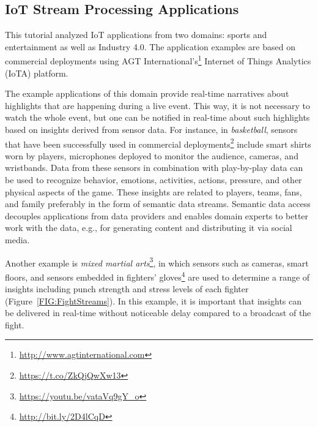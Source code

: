 \subsection{IoT Stream Processing Applications}
This tutorial analyzed IoT applications from two domains: sports and entertainment as well as Industry 4.0. The application examples are based on commercial deployments using AGT International's\footnote{\url{http://www.agtinternational.com}} Internet of Things Analytics (IoTA) platform.

The example applications of this domain provide real-time narratives about highlights that are happening during a live event. This way, it is not necessary to watch the whole event, but one can be notified in real-time about such highlights based on insights derived from sensor data. For instance, in \emph{basketball}, sensors that have been successfully used in commercial deployments\footnote{\url{https://t.co/ZkQjQwXw13}} include smart shirts worn by players, microphones deployed to monitor the audience,  cameras, and wristbands. Data from these sensors in combination with play-by-play data can be used to recognize behavior, emotions, activities, actions, pressure, and other physical aspects of the game. These insights are related to players, teams, fans, and family preferably in the form of semantic data streams. Semantic data access decouples applications from data providers and enables domain experts to better work with the data, e.g., for generating content and distributing it via social media.

Another example is \emph{mixed martial arts}\footnote{\url{https://youtu.be/vataVq9gY_o}}, in which sensors such as cameras, smart floors, and sensors embedded in fighters' gloves\footnote{\url{http://bit.ly/2D4lCqD}} are used to determine a range of insights including punch strength and stress levels of each fighter (Figure~\ref{FIG:FightStreams}). In this example, it is important that insights can be delivered in real-time without noticeable delay compared to a broadcast of the fight.

